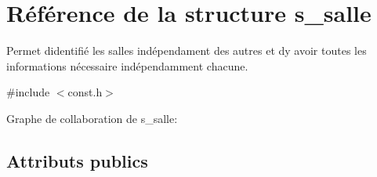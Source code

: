 \hypertarget{structs__salle}{}\section{Référence de la structure s\+\_\+salle}
\label{structs__salle}


Permet d\textquotesingle{}identifié les salles indépendament des autres et d\textquotesingle{}y avoir toutes les informations nécessaire indépendamment chacune.  




{\ttfamily \#include $<$const.\+h$>$}



Graphe de collaboration de s\+\_\+salle\+:
\subsection*{Attributs publics}
